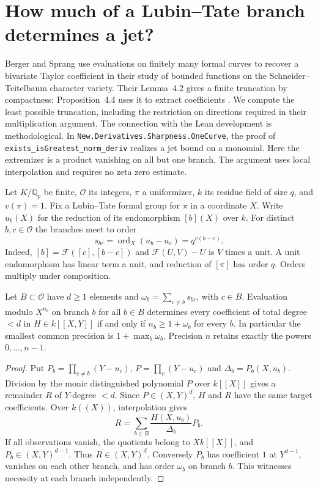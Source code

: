 \section{How much of a Lubin--Tate branch determines a jet?}
\label{sec:lubin}
Berger and Sprang use evaluations on finitely many formal curves to recover a bivariate Taylor coefficient in their study of bounded functions on the Schneider--Teitelbaum character variety. Their Lemma~4.2 gives a finite truncation by compactness; Proposition~4.4 uses it to extract coefficients \cite{BS}. We compute the least possible truncation, including the restriction on directions required in their multiplication argument. The connection with the Lean development is methodological. In \texttt{New.Derivatives.Sharpness.OneCurve}, the proof of \texttt{exists\_isGreatest\_norm\_deriv} realizes a jet bound on a monomial. Here the extremizer is a product vanishing on all but one branch. The argument uses local interpolation and requires no zeta zero estimate.

Let $K/\mathbb Q_p$ be finite, $\mathcal O$ its integers, $\pi$ a uniformizer, $k$ its residue field of size $q$, and $v(\pi)=1$. Fix a Lubin--Tate formal group for $\pi$ in a coordinate $X$. Write $u_b(X)$ for the reduction of its endomorphism $[b](X)$ over $k$. For distinct $b,c\in\mathcal O$ the branches meet to order
\[
 s_{bc}=\operatorname{ord}_X(u_b-u_c)=q^{v(b-c)}.
\]
Indeed, $[b]=\mathcal F([c],[b-c])$ and $\mathcal F(U,V)-U$ is $V$ times a unit. A unit endomorphism has linear term a unit, and reduction of $[\pi]$ has order $q$. Orders multiply under composition.

\begin{theorem}\label{thm:branch}
Let $B\subset\mathcal O$ have $d\ge1$ elements and $\omega_b=\sum_{c\ne b}s_{bc}$, with $c\in B$. Evaluation modulo $X^{n_b}$ on branch $b$ for all $b\in B$ determines every coefficient of total degree $<d$ in $H\in k[[X,Y]]$ if and only if $n_b\ge 1+\omega_b$ for every $b$. In particular the smallest common precision is $1+\max_b\omega_b$. Precision $n$ retains exactly the powers $0,\ldots,n-1$.
\end{theorem}
\begin{proof}
Put $P_b=\prod_{c\ne b}(Y-u_c)$, $P=\prod_c(Y-u_c)$ and $\Delta_b=P_b(X,u_b)$. Division by the monic distinguished polynomial $P$ over $k[[X]]$ gives a remainder $R$ of $Y$-degree $<d$. Since $P\in(X,Y)^d$, $H$ and $R$ have the same target coefficients. Over $k((X))$, interpolation gives
\[
 R=\sum_{b\in B}\frac{H(X,u_b)}{\Delta_b}P_b.
\]
If all observations vanish, the quotients belong to $Xk[[X]]$, and $P_b\in(X,Y)^{d-1}$. Thus $R\in(X,Y)^d$. Conversely $P_b$ has coefficient $1$ at $Y^{d-1}$, vanishes on each other branch, and has order $\omega_b$ on branch $b$. This witnesses necessity at each branch independently.
\end{proof}

